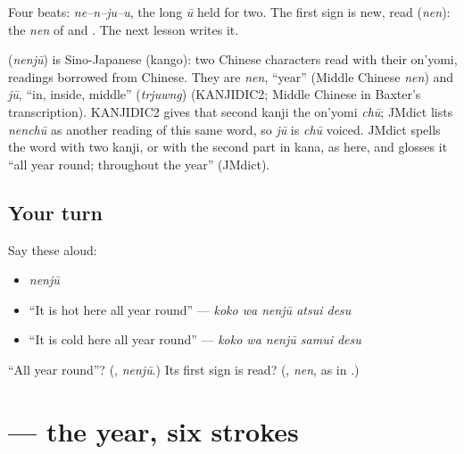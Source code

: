 Four beats: \emph{ne–n–ju–u}, the long \emph{ū} held for two. The first sign is new, read \textbf{} (\emph{nen}): the \emph{nen} of \textbf{} and \textbf{}. The next lesson writes it.

\begin{cousinweb}
\textbf{} (\emph{nenjū}) is Sino-Japanese (kango): two Chinese characters read with their on'yomi, readings borrowed from Chinese. They are \emph{nen}, \textquotedblleft{}year\textquotedblright{} (Middle Chinese \emph{nen}) and \emph{jū}, \textquotedblleft{}in, inside, middle\textquotedblright{} (\emph{trjuwng}) (KANJIDIC2; Middle Chinese in Baxter's transcription). KANJIDIC2 gives that second kanji the on'yomi \emph{chū}; JMdict lists \emph{nenchū} as another reading of this same word, so \emph{jū} is \emph{chū} voiced. JMdict spells the word with two kanji, or with the second part in kana, as here, and glosses it \textquotedblleft{}all year round; throughout the year\textquotedblright{} (JMdict).
\end{cousinweb}

\subsection*{Your turn}
Say these aloud:

\begin{itemize}
\raggedright
  \item \emph{nenjū}
  \item \textquotedblleft{}It is hot here all year round\textquotedblright{} — \emph{koko wa nenjū atsui desu}
  \item \textquotedblleft{}It is cold here all year round\textquotedblright{} — \emph{koko wa nenjū samui desu}
\end{itemize}

\begin{tcolorbox}[breakable,colback=teal!4,colframe=teal!35!black,title={Before you move on}]
\textquotedblleft{}All year round\textquotedblright{}? (\textbf{}, \emph{nenjū}.) Its first sign is read? (\textbf{}, \emph{nen}, as in \textbf{}.)
\end{tcolorbox}
\section[\texorpdfstring{\ja{年} (nen)}{年 (nen)}]{ — the year, six strokes}

\label{lesson:JA-W253-nen-kanji}



